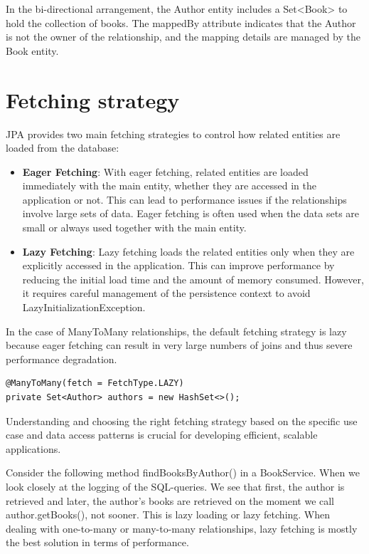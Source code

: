 In the bi-directional arrangement, the Author entity includes a Set<Book> to hold the collection of books. The mappedBy attribute indicates that the Author is not the owner of the relationship, and the mapping details are managed by the Book entity.

\section{Fetching strategy}

JPA provides two main fetching strategies to control how related entities are loaded from the database:

\begin{itemize}
\item \textbf{Eager Fetching}: With eager fetching, related entities are loaded immediately with the main entity, whether they are accessed in the application or not. This can lead to performance issues if the relationships involve large sets of data. Eager fetching is often used when the data sets are small or always used together with the main entity.

\item \textbf{Lazy Fetching}: Lazy fetching loads the related entities only when they are explicitly accessed in the application. This can improve performance by reducing the initial load time and the amount of memory consumed. However, it requires careful management of the persistence context to avoid LazyInitializationException.
\end{itemize}

In the case of ManyToMany relationships, the default fetching strategy is lazy because eager fetching can result in very large numbers of joins and thus severe performance degradation.

\begin{lstlisting}
@ManyToMany(fetch = FetchType.LAZY)
private Set<Author> authors = new HashSet<>();
\end{lstlisting} 

Understanding and choosing the right fetching strategy based on the specific use case and data access patterns is crucial for developing efficient, scalable applications.

Consider the following method findBooksByAuthor() in a BookService.
When we look closely at the logging of the SQL-queries. We see that first, the author is retrieved and later, the author's books are retrieved on the moment we call author.getBooks(), not sooner. This is lazy loading or lazy fetching. When dealing with one-to-many or many-to-many relationships, lazy fetching is mostly the best solution in terms of performance.

